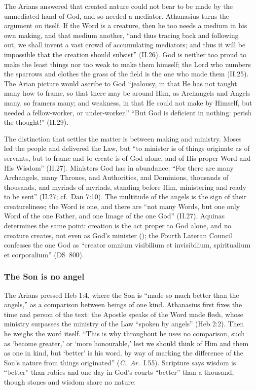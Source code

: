 \noindent The Arians answered that created nature could not bear to be
made by the unmediated hand of God, and so needed a mediator. Athanasius
turns the argument on itself. If the Word is a creature, then he too
needs a medium in his own making, and that medium another, ``and thus
tracing back and following out, we shall invent a vast crowd of
accumulating mediators; and thus it will be impossible that the creation
should subsist'' (II.26). God is neither too proud to make the least
things nor too weak to make them himself; the Lord who numbers the
sparrows and clothes the grass of the field is the one who made them
(II.25). The Arian picture would ascribe to God ``jealousy, in that He has
not taught many how to frame, so that there may be around Him, as
Archangels and Angels many, so framers many; and weakness, in that He
could not make by Himself, but needed a fellow-worker, or under-worker.''
``But God is deficient in nothing: perish the thought!'' (II.29).

The distinction that settles the matter is between making and ministry.
Moses led the people and delivered the Law, but ``to minister is of
things originate as of servants, but to frame and to create is of God
alone, and of His proper Word and His Wisdom'' (II.27). Ministers God has
in abundance: ``For there are many Archangels, many Thrones, and
Authorities, and Dominions, thousands of thousands, and myriads of
myriads, standing before Him, ministering and ready to be sent'' (II.27;
cf.\ Dan 7:10). The multitude of the angels is the sign of their
creatureliness; the Word is one, and there are ``not many Words, but one
only Word of the one Father, and one Image of the one God'' (II.27).
Aquinas determines the same point: creation is the act
proper to God alone, and no creature creates, not even as God's
minister (); the Fourth Lateran Council confesses the one
God as ``creator omnium visibilium et invisibilium, spiritualium et
corporalium'' (DS~800).

\subsubsection{The Son is no angel}

The Arians pressed Heb 1:4, where the Son is ``made so much better than
the angels,'' as a comparison between beings of one kind. Athanasius
first fixes the time and person of the text: the Apostle speaks of the
Word made flesh, whose ministry surpasses the ministry of the Law ``spoken
by angels'' (Heb 2:2). Then he weighs the word itself. ``This is why
throughout he uses no comparison, such as `become greater,' or `more
honourable,' lest we should think of Him and them as one in kind, but
`better' is his word, by way of marking the difference of the Son's
nature from things originated'' (\emph{C.\ Ar.}\ I.55). Scripture says
wisdom is ``better'' than rubies and one day in God's courts ``better''
than a thousand, though stones and wisdom share no nature:

